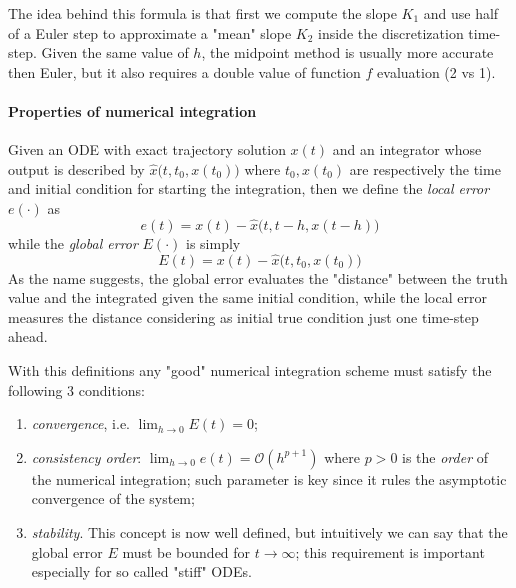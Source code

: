 	The idea behind this formula is that first we compute the slope $K_1$ and use half of a Euler step to approximate a "mean" slope $K_2$ inside the discretization time-step. Given the same value of $h$, the midpoint method is usually more accurate then Euler, but it also requires a double value of function $f$ evaluation (2 vs 1).
	
	\paragraph{Properties of numerical integration} Given an ODE with exact trajectory solution $x(t)$ and an integrator whose output is described by $\hat x\big(t,t_0, x(t_0)\big)$ where $t_0, x(t_0)$ are respectively the time and initial condition for starting the integration, then we define the \textit{local error} $e(\cdot)$ as
	\begin{equation} \label{eq:localerror}
		e(t) = x(t) - \hat x\big(t, t-h, x(t-h)\big)
	\end{equation}
	while the \textit{global error} $E(\cdot)$ is simply
	\begin{equation}
		E(t) = x(t) - \hat x\big(t,t_0, x(t_0)\big)
	\end{equation}
	As the name suggests, the global error evaluates the "distance" between the truth value and the integrated given the same initial condition, while the local error measures the distance considering as initial true condition just one time-step ahead.
	
	With this definitions any "good" numerical integration scheme must satisfy the following 3 conditions:
	\begin{enumerate}[\itshape i)]
		\item \textit{convergence}, i.e. $\lim_{h\rightarrow 0} E(t) = 0$;
		\item \textit{consistency order}: $\lim_{h\rightarrow 0} e(t) = \mathcal O(h^{p+1})$ where $p > 0$ is the \textit{order} of the numerical integration; such parameter is key since it rules the asymptotic convergence of the system;
		\item \textit{stability}. This concept is now well defined, but intuitively we can say that the global error $E$ must be bounded for $t \rightarrow \infty$; this requirement is important especially for so called "stiff" ODEs.
 	\end{enumerate}
	
